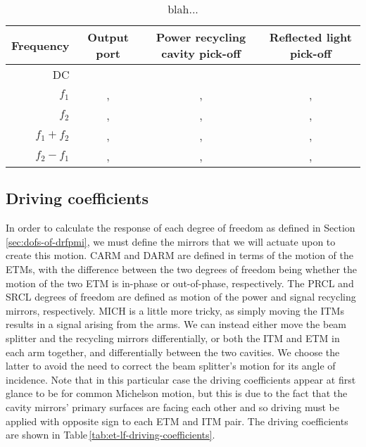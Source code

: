 \begin{table}
  \centering
  {\renewcommand{\arraystretch}{1.2} %
    \begin{tabular}{r|ccc}
      \textbf{Frequency} & \textbf{Output port} & \textbf{Power recycling cavity pick-off} & \textbf{Reflected light pick-off} \\
      \hline
      \gls{DC} & \ASDC{} & \POPDC{} & \REFLDC{} \\
      $f_1$    & \ASFIRSTI{}, \ASFIRSTQ{} & \POPFIRSTI{}, \POPFIRSTQ{} & \REFLFIRSTI{}, \REFLFIRSTQ{} \\
      $f_2$    & \ASSECONDI{}, \ASSECONDQ{} & \POPSECONDI{}, \POPSECONDQ{} & \REFLSECONDI{}, \REFLSECONDQ{} \\
      $f_1 + f_2$ & \ASSUMI{}, \ASSUMQ{} & \POPSUMI{}, \POPSUMQ{} & \REFLSUMI{}, \REFLSUMQ{} \\
      $f_2 - f_1$ & \ASDIFFI{}, \ASDIFFQ{} & \POPDIFFI{}, \POPDIFFQ{} & \REFLDIFFI{}, \REFLDIFFQ{}
    \end{tabular}
  }
  \caption{\label{tab:et-lf-probes}blah...}
\end{table}

\subsection{Driving coefficients}
In order to calculate the response of each degree of freedom as defined in Section\,\ref{sec:dofs-of-drfpmi}, we must define the mirrors that we will actuate upon to create this motion. \gls{CARM} and \gls{DARM} are defined in terms of the motion of the \glspl{ETM}, with the difference between the two degrees of freedom being whether the motion of the two \gls{ETM} is in-phase or out-of-phase, respectively. The \gls{PRCL} and \gls{SRCL} degrees of freedom are defined as motion of the power and signal recycling mirrors, respectively. \gls{MICH} is a little more tricky, as simply moving the \glspl{ITM} results in a signal arising from the arms. We can instead either move the beam splitter and the recycling mirrors differentially, or both the \gls{ITM} and \gls{ETM} in each arm together, and differentially between the two cavities. We choose the latter to avoid the need to correct the beam splitter's motion for its angle of incidence. Note that in this particular case the driving coefficients appear at first glance to be for common Michelson motion, but this is due to the fact that the cavity mirrors' primary surfaces are facing each other and so driving must be applied with opposite sign to each \gls{ETM} and \gls{ITM} pair. The driving coefficients are shown in Table\,\ref{tab:et-lf-driving-coefficients}.

